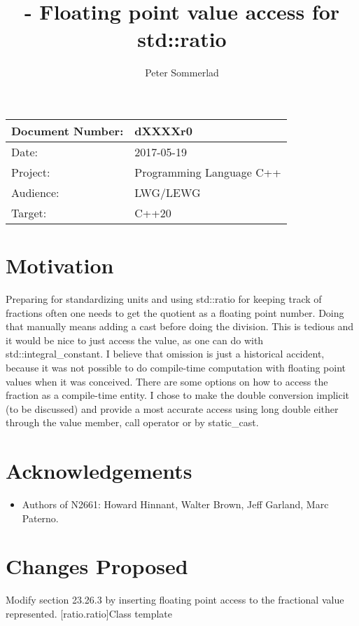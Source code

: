 \documentclass[ebook,11pt,article]{memoir}
\title{\papernumber{} - Floating point value access for std::ratio}
\author{Peter Sommerlad}
\date{\paperdate}                        %
\newcommand{\papernumber}{dXXXXr0}
\newcommand{\paperdate}{2017-05-19}
\begin{document}
\maketitle
\begin{tabular}[t]{|l|l|}\hline 
Document Number:& \papernumber  \\\hline
Date: & \paperdate \\\hline
Project: & Programming Language C++\\\hline 
Audience: & LWG/LEWG\\\hline
Target: & C++20\\\hline
\end{tabular}

\chapter{Motivation}

Preparing for standardizing units and using std::ratio for keeping track of fractions often one needs to get the quotient as a floating point number. Doing that manually means adding a cast before doing the division. This is tedious and it would be nice to just access the value, as one can do with std::integral_constant. I believe that omission is just a historical accident, because it was not possible to do compile-time computation with floating point values when it was conceived. There are some options on how to access the fraction as a compile-time entity. I chose to make the double conversion implicit (to be discussed) and provide a most accurate access using long double either through the value member, call operator or by static_cast. 

\chapter{Acknowledgements}
\begin{itemize}
\item Authors of N2661: Howard Hinnant, Walter Brown, Jeff Garland, Marc Paterno.
\end{itemize}

\chapter{Changes Proposed}
Modify section 23.26.3 by inserting floating point access to the fractional value represented.
[ratio.ratio]{Class template }
\end{document}

